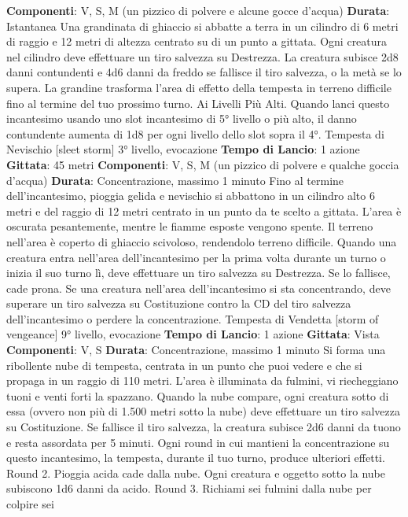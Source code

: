 \begin{multicols}{2}
\textbf{Componenti}: V, S, M (un pizzico di polvere e alcune
gocce d’acqua)
\textbf{Durata}: Istantanea
Una grandinata di ghiaccio si abbatte a terra in un
cilindro di 6 metri di raggio e 12 metri di altezza centrato
su di un punto a gittata. Ogni creatura nel cilindro deve
effettuare un tiro salvezza su Destrezza. La creatura
subisce 2d8 danni contundenti e 4d6 danni da freddo
se fallisce il tiro salvezza, o la metà se lo supera.
La grandine trasforma l’area di effetto della tempesta in
terreno difficile fino al termine del tuo prossimo turno.
Ai Livelli Più Alti. Quando lanci questo incantesimo
usando uno slot incantesimo di 5° livello o più alto, il
danno contundente aumenta di 1d8 per ogni livello dello
slot sopra il 4°.
Tempesta di Nevischio
[sleet storm]
3° livello, evocazione
\textbf{Tempo di Lancio}: 1 azione
\textbf{Gittata}: 45 metri
\textbf{Componenti}: V, S, M (un pizzico di polvere e qualche
goccia d’acqua)
\textbf{Durata}: Concentrazione, massimo 1 minuto
Fino al termine dell’incantesimo, pioggia gelida e
nevischio si abbattono in un cilindro alto 6 metri e del
raggio di 12 metri centrato in un punto da te scelto a
gittata. L’area è oscurata pesantemente, mentre le
fiamme esposte vengono spente.
Il terreno nell’area è coperto di ghiaccio scivoloso,
rendendolo terreno difficile. Quando una creatura entra
nell’area dell’incantesimo per la prima volta durante un
turno o inizia il suo turno lì, deve effettuare un tiro
salvezza su Destrezza. Se lo fallisce, cade prona.
Se una creatura nell’area dell’incantesimo si sta
concentrando, deve superare un tiro salvezza su
Costituzione contro la CD del tiro salvezza
dell’incantesimo o perdere la concentrazione.
Tempesta di Vendetta
[storm of vengeance]
9° livello, evocazione
\textbf{Tempo di Lancio}: 1 azione
\textbf{Gittata}: Vista
\textbf{Componenti}: V, S
\textbf{Durata}: Concentrazione, massimo 1 minuto
Si forma una ribollente nube di tempesta, centrata in un
punto che puoi vedere e che si propaga in un raggio di
110 metri. L’area è illuminata da fulmini, vi riecheggiano
tuoni e venti forti la spazzano. Quando la nube
compare, ogni creatura sotto di essa (ovvero non più di
1.500 metri sotto la nube) deve effettuare un tiro
salvezza su Costituzione. Se fallisce il tiro salvezza, la
creatura subisce 2d6 danni da tuono e resta assordata
per 5 minuti.
Ogni round in cui mantieni la concentrazione su questo
incantesimo, la tempesta, durante il tuo turno, produce
ulteriori effetti.
Round 2. Pioggia acida cade dalla nube. Ogni creatura
e oggetto sotto la nube subiscono 1d6 danni da acido.
Round 3. Richiami sei fulmini dalla nube per colpire sei

\end{multicols}
